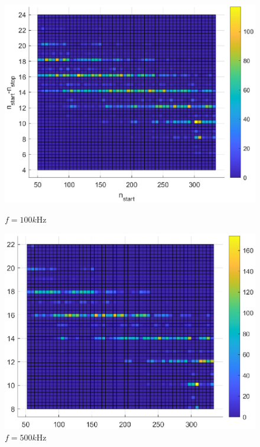 \begin{figure}[H]
     \centering
     \begin{minipage}{0.45\textwidth}
         \centering
         \includegraphics[width=\textwidth]{imagenes/start-stop_100k.eps} %
         \caption{$f = 100k$Hz}
     \end{minipage}\hfill
     \begin{minipage}{0.45\textwidth}
         \centering
         \includegraphics[width=\textwidth]{imagenes/start-stop_500k.eps} %
         \caption{$f = 500k$Hz}
     \end{minipage}
     

\end{figure}
